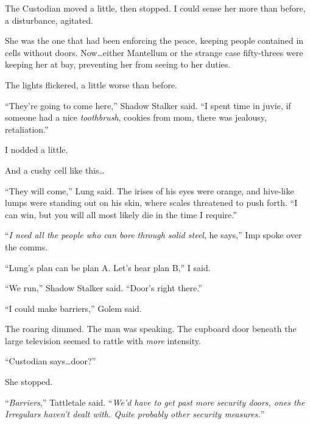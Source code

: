 The Custodian moved a little, then stopped.  I could sense her more than before, a disturbance, agitated.



She was the one that had been enforcing the peace, keeping people contained in cells without doors.  Now\ldots either Mantellum or the strange case fifty-threes were keeping her at bay, preventing her from seeing to her duties.



The lights flickered, a little worse than before.



``They're going to come here,'' Shadow Stalker said.  ``I spent time in juvie, if someone had a nice \emph{toothbrush}, cookies from mom, there was jealousy, retaliation.''



I nodded a little.



And a cushy cell like this\ldots



``They will come,'' Lung said.  The irises of his eyes were orange, and hive-like lumps were standing out on his skin, where scales threatened to push forth.  ``I can win, but you will all most likely die in the time I require.''



``\emph{I need all the people who can bore through solid steel}, he says,'' Imp spoke over the comms.



``Lung's plan can be plan A.  Let's hear plan B,'' I said.



``We run,'' Shadow Stalker said.  ``Door's right there.''



``I could make barriers,'' Golem said.



The roaring dimmed.  The man was speaking.  The cupboard door beneath the large television seemed to rattle with \emph{more} intensity.



``Custodian says\ldots door?''



She stopped.



``\emph{Barriers},'' Tattletale said.  ``\emph{We'd have to get past more security doors, ones the Irregulars haven't dealt with.  Quite probably other security measures.}''



